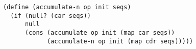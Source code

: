 \documentclass[a4paper,12pt]{article}
\begin{document}
\begin{lstlisting}
(define (accumulate-n op init seqs)
  (if (null? (car seqs))
      null
      (cons (accumulate op init (map car seqs))
            (accumulate-n op init (map cdr seqs)))))
\end{lstlisting}
\end{document}
